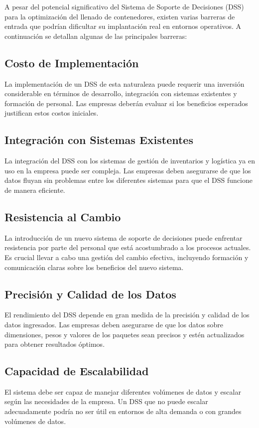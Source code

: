 \documentclass[9pt,a4paper]{rho}
\begin{document}
A pesar del potencial significativo del Sistema de Soporte de Decisiones (DSS) para la optimización del llenado de contenedores, existen varias barreras de entrada que podrían dificultar su implantación real en entornos operativos. A continuación se detallan algunas de las principales barreras:

\subsection{Costo de Implementación}
La implementación de un DSS de esta naturaleza puede requerir una inversión considerable en términos de desarrollo, integración con sistemas existentes y formación de personal. Las empresas deberán evaluar si los beneficios esperados justifican estos costos iniciales.

\subsection{Integración con Sistemas Existentes}
La integración del DSS con los sistemas de gestión de inventarios y logística ya en uso en la empresa puede ser compleja. Las empresas deben asegurarse de que los datos fluyan sin problemas entre los diferentes sistemas para que el DSS funcione de manera eficiente.

\subsection{Resistencia al Cambio}
La introducción de un nuevo sistema de soporte de decisiones puede enfrentar resistencia por parte del personal que está acostumbrado a los procesos actuales. Es crucial llevar a cabo una gestión del cambio efectiva, incluyendo formación y comunicación claras sobre los beneficios del nuevo sistema.

\subsection{Precisión y Calidad de los Datos}
El rendimiento del DSS depende en gran medida de la precisión y calidad de los datos ingresados. Las empresas deben asegurarse de que los datos sobre dimensiones, pesos y valores de los paquetes sean precisos y estén actualizados para obtener resultados óptimos.

\subsection{Capacidad de Escalabilidad}
El sistema debe ser capaz de manejar diferentes volúmenes de datos y escalar según las necesidades de la empresa. Un DSS que no puede escalar adecuadamente podría no ser útil en entornos de alta demanda o con grandes volúmenes de datos.
\end{document}
